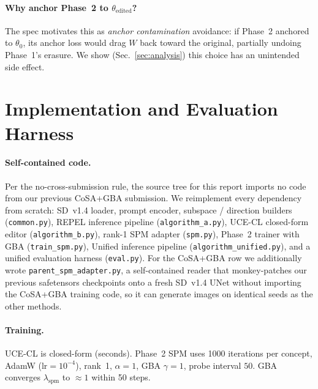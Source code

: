 \documentclass[10pt,twocolumn,letterpaper]{article}
\begin{document}
\paragraph{Why anchor Phase~2 to $\theta_\text{edited}$?} The spec
motivates this as \emph{anchor contamination} avoidance: if Phase~2
anchored to $\theta_0$, its anchor loss would drag $W$ back toward the
original, partially undoing Phase~1's erasure. We show
(Sec.~\ref{sec:analysis}) this choice has an unintended side effect.

\section{Implementation and Evaluation Harness}
\label{sec:impl}

\paragraph{Self-contained code.} Per the no-cross-submission rule, the
source tree for this report imports no code from our previous CoSA+GBA
submission. We reimplement every dependency from scratch: SD~v1.4 loader,
prompt encoder, subspace / direction builders (\texttt{common.py}),
REPEL inference pipeline (\texttt{algorithm\_a.py}), UCE-CL closed-form
editor (\texttt{algorithm\_b.py}), rank-1 SPM adapter (\texttt{spm.py}),
Phase~2 trainer with GBA (\texttt{train\_spm.py}), Unified inference
pipeline (\texttt{algorithm\_unified.py}), and a unified evaluation
harness (\texttt{eval.py}). For the CoSA+GBA row we additionally wrote
\texttt{parent\_spm\_adapter.py}, a self-contained reader that monkey-patches
our previous safetensors checkpoints onto a fresh SD~v1.4 UNet without
importing the CoSA+GBA training code, so it can generate images on
identical seeds as the other methods.

\paragraph{Training.} UCE-CL is closed-form (seconds). Phase~2 SPM uses
1000 iterations per concept, AdamW ($\mathrm{lr}{=}10^{-4}$), rank~1,
$\alpha{=}1$, GBA $\gamma{=}1$, probe interval $50$. GBA converges
$\lambda_\text{spm}$ to $\approx 1$ within 50 steps.
\end{document}
